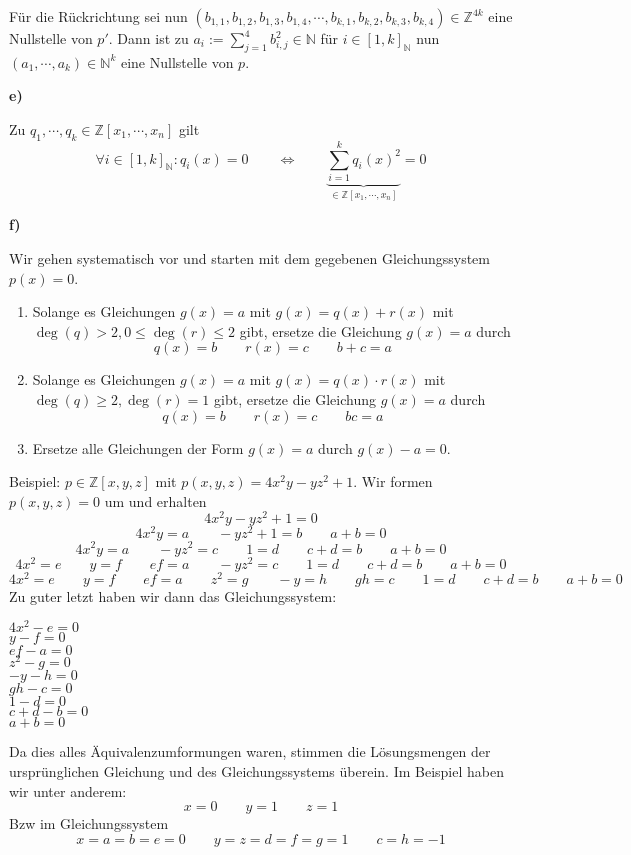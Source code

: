 \documentclass[a4paper,graphics,11pt]{article}
\begin{document}
Für die Rückrichtung sei nun
$(b_{1,1},b_{1,2},b_{1,3},b_{1,4},\cdots,b_{k,1},b_{k,2},b_{k,3},b_{k,4}) \in \mathbb{Z}^{4k}$
eine Nullstelle von $p'$. Dann ist zu $a_i := \sum_{j=1}^{4} b_{i,j}^2 \in \mathbb{N}$ für $i\in[1,k]_{\mathbb{N}}$ nun
$(a_1,\cdots,a_k) \in \mathbb{N}^k$ eine Nullstelle von $p$.

\strut

\textbf{e)}

Zu $q_1,\cdots,q_k \in \mathbb{Z}[x_1,\cdots,x_n]$ gilt
$$
    \forall i \in [1,k]_{\mathbb{N}}: q_i(x) = 0
    \qquad\iff\qquad
    \underbrace{\sum_{i=1}^{k} q_i(x)^2}_{\in \mathbb{Z}[x_1,\cdots,x_n]} = 0
$$

\newpage

\textbf{f)}

Wir gehen systematisch vor und starten mit dem gegebenen Gleichungssystem $p(x) = 0$.
\begin{enumerate}
    \item Solange es Gleichungen $g(x) = a$ mit $g(x) = q(x) + r(x)$ mit
        $\deg(q) > 2, 0 \leq \deg(r) \leq 2$ gibt, ersetze die Gleichung $g(x) = a$ durch
        $$
            q(x) = b \qquad r(x) = c \qquad b+c = a
        $$
    \item Solange es Gleichungen $g(x) = a$ mit $g(x) = q(x)\cdot r(x)$ mit
        $\deg(q) \geq 2, \deg(r) = 1$ gibt, ersetze die Gleichung $g(x) = a$ durch
        $$
            q(x) = b \qquad r(x) = c \qquad bc = a
        $$
    \item Ersetze alle Gleichungen der Form $g(x) = a$ durch $g(x) - a = 0$.
\end{enumerate}
Beispiel: $p \in \mathbb{Z}[x,y,z]$ mit $p(x,y,z) = 4x^2y-yz^2+1$. Wir formen $p(x,y,z) = 0$ um und erhalten
$$
    4x^2y-yz^2+1 = 0
$$
$$
    4x^2y = a \qquad -yz^2 + 1 = b \qquad a+b = 0
$$
$$
    4x^2y = a \qquad -yz^2  = c \qquad 1 = d \qquad c+d = b \qquad a+b = 0
$$
$$
    4x^2 = e \qquad y = f \qquad ef = a \qquad -yz^2  = c \qquad 1 = d \qquad c+d = b \qquad a+b = 0
$$
$$
    4x^2 = e \qquad y = f \qquad ef = a \qquad z^2 = g \qquad -y = h \qquad gh = c \qquad 1 = d \qquad c+d = b \qquad a+b = 0
$$
Zu guter letzt haben wir dann das Gleichungssystem:

\begin{minipage}{.3\textwidth}
$4x^2 - e = 0$\\
$y-f = 0$\\
$ef -a = 0$\\
$z^2 - g = 0$\\
$-y -h = 0$\\
$gh - c = 0$\\
$1 - d = 0$\\
$c+d - b = 0$\\
$a+b = 0$
\end{minipage}
\begin{minipage}{.7\textwidth}
    Da dies alles Äquivalenzumformungen waren, stimmen die Lösungsmengen
    der ursprünglichen Gleichung und des Gleichungssystems überein.
    Im Beispiel haben wir unter anderem:
    $$
        x = 0\qquad
        y= 1\qquad
        z = 1
    $$
    Bzw im Gleichungssystem
    $$
        x = a = b = e = 0 \qquad
        y = z = d = f = g = 1\qquad
        c = h = -1
    $$
\end{minipage}
\end{document}
